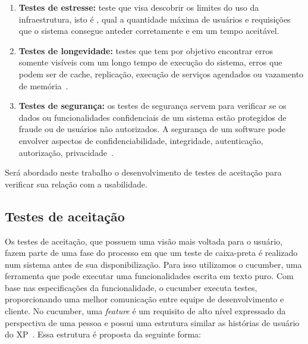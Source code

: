 \begin{enumerate}
\item \textbf{Testes de estresse:} teste que visa descobrir os limites do uso da 
infraestrutura, isto é , qual a quantidade máxima de usuários e requisições que o 
sistema consegue anteder corretamente e em um tempo aceitável.

\item \textbf{Testes de longevidade:} testes que tem por objetivo encontrar erros 
somente visíveis com um longo tempo de execução do sistema, erros que podem ser de cache, replicação, execução de serviços agendados ou vazamento de memória~\cite{bernardo2011}.

\item \textbf{Testes de segurança:} os testes de segurança servem para verificar se 
os dados ou funcionalidades confidenciais de um sistema  estão protegidos de fraude 
ou de usuários não autorizados. A segurança de um software pode envolver aspectos de 
confidenciabilidade, integridade, autenticação, autorização, privacidade~\cite{whittaker2006}.

\end{enumerate}

Será abordado neste trabalho o desenvolvimento de testes de aceitação para verificar sua relação com a usabilidade. 

\subsection{Testes de aceitação}

Os testes de aceitação, que possuem uma visão mais voltada para o usuário, fazem 
parte de uma fase do processo em que um teste de caixa-preta é realizado 
num sistema antes de sua disponibilização.
Para isso utilizamos o cucumber, uma ferramenta que pode executar uma funcionalidades escrita em texto puro. Com base nas especificações da funcionalidade, o cucumber executa testes, proporcionando uma melhor comunicação entre equipe de desenvolvimento e cliente.
%
No cucumber, uma \textit{feature} é um requisito de alto nível 
expressado da perspectiva de uma pessoa e possui uma estrutura similar as histórias 
de usuário do XP~. Essa estrutura é proposta da seguinte forma:

